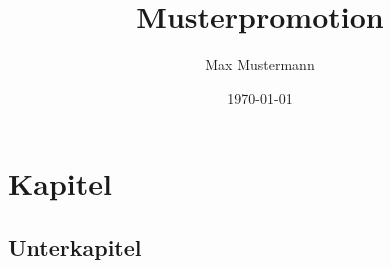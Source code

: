 \documentclass[a4paper]{scrreprt}
\begin{document}
\newcommand{\ThesisAuthor}{Max Mustermann}
\newcommand{\ThesisTitle}{Musterpromotion}

\author{\ThesisAuthor}
\title{\ThesisTitle}
\date{\today}

\maketitle
\tableofcontents

\section{Kapitel}

\subsection{Unterkapitel}


\end{document}
